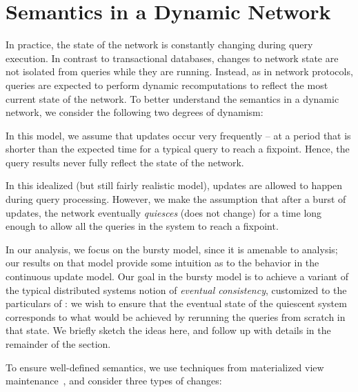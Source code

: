 \section{Semantics in a Dynamic Network}
\label{sec:dynamic}

In practice, the state of the network is constantly changing during
query execution. In contrast to transactional databases, changes to
network state are not isolated from queries
while they are running.  Instead, as in network protocols, queries
are expected to perform dynamic recomputations to reflect the most current state of the
network. To better understand the semantics in a dynamic network, we
consider the following two degrees of dynamism:   

\vspace{1pt}

In this model, we assume that
updates occur very frequently -- at a period that is shorter than the
expected time for a typical query to reach a fixpoint. Hence, the query
results never fully reflect the state of the network.
 
\vspace{1pt}
In this idealized (but still fairly realistic model), updates are allowed
  to happen during query processing.  However, we make the assumption
  that after a burst of updates, the network eventually {\em quiesces}
  (does not change) for a time long enough to allow all the
  queries in the system to reach a fixpoint. 

In our analysis, we focus on the bursty model, since it is amenable to
analysis; our results on that model provide some intuition as to the
behavior in the continuous update model.  Our goal in the bursty model
is to achieve a variant of the typical distributed systems notion of {\em eventual
  consistency}, customized to the particulars of \Dlog: we wish to
ensure that the eventual state of the quiescent system corresponds to
what would be achieved by rerunning the queries from scratch
in that state. We briefly sketch the ideas here, and follow up with
details in the remainder of the section.  

To ensure well-defined semantics, we use techniques from materialized view
maintenance~\cite{viewIncremental}, and consider three types of changes:


